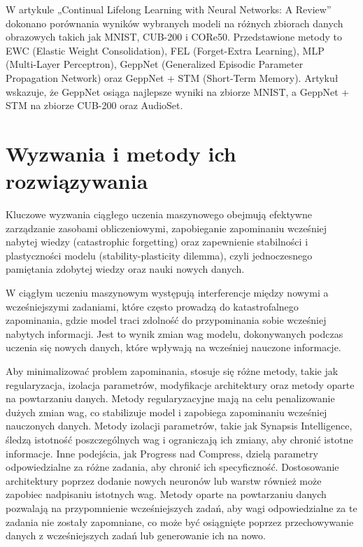 \documentclass[a4paper,12pt]{article}
\begin{document}
W artykule „Continual Lifelong Learning with Neural Networks: A Review” dokonano porównania wyników wybranych modeli na różnych zbiorach danych obrazowych takich jak MNIST, CUB-200 i CORe50. Przedstawione metody to EWC (Elastic Weight Consolidation), FEL (Forget-Extra Learning), MLP (Multi-Layer Perceptron), GeppNet (Generalized Episodic Parameter Propagation Network) oraz GeppNet + STM (Short-Term Memory). Artykuł wskazuje, że GeppNet osiąga najlepsze wyniki na zbiorze MNIST, a GeppNet + STM na zbiorze CUB-200 oraz AudioSet.



\section{Wyzwania i metody ich rozwiązywania}
Kluczowe wyzwania ciągłego uczenia maszynowego obejmują efektywne zarządzanie zasobami obliczeniowymi, zapobieganie zapominaniu wcześniej nabytej wiedzy (catastrophic forgetting) oraz zapewnienie stabilności i plastyczności modelu (stability-plasticity dilemma), czyli jednoczesnego pamiętania zdobytej wiedzy oraz nauki nowych danych. 

W ciągłym uczeniu maszynowym występują interferencje między nowymi a wcześniejszymi zadaniami, które często prowadzą do katastrofalnego zapominania, gdzie model traci zdolność do przypominania sobie wcześniej nabytych informacji. Jest to wynik zmian wag modelu, dokonywanych podczas uczenia się nowych danych, które wpływają na wcześniej nauczone informacje.

Aby minimalizować problem zapominania, stosuje się różne metody, takie jak regularyzacja, izolacja parametrów, modyfikacje architektury oraz metody oparte na powtarzaniu danych. Metody regularyzacyjne mają na celu penalizowanie dużych zmian wag, co stabilizuje model i zapobiega zapominaniu wcześniej nauczonych danych. Metody izolacji parametrów, takie jak Synapsis Intelligence, śledzą istotność poszczególnych wag i ograniczają ich zmiany, aby chronić istotne informacje. Inne podejścia, jak Progress nad Compress, dzielą parametry odpowiedzialne za różne zadania, aby chronić ich specyficzność. Dostosowanie architektury poprzez dodanie nowych neuronów lub warstw również może zapobiec nadpisaniu istotnych wag. Metody oparte na powtarzaniu danych pozwalają na przypomnienie wcześniejszych zadań, aby wagi odpowiedzialne za te zadania nie zostały zapomniane, co może być osiągnięte poprzez przechowywanie danych z wcześniejszych zadań lub generowanie ich na nowo.
\end{document}
